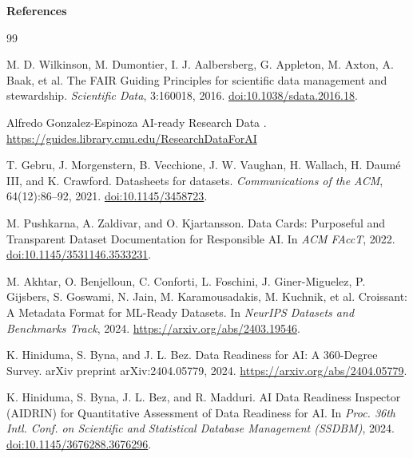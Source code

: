 \documentclass[10pt]{article}
\newcommand{\currentproposalpart}{Main Workshop Proposal}
\newcommand{\setproposalpart}[1]{\gdef\currentproposalpart{#1}}
\newcommand{\proposalbanner}[2]{%
  \noindent\colorbox{black!8}{\parbox{\dimexpr\linewidth-2\fboxsep\relax}{\textbf{#1}\hfill\textit{#2}}}%
  \vspace{2pt}%
}
\begin{document}
\clearpage
\setproposalpart{References}
\proposalbanner{References}{}
\renewcommand{\refname}{References}
\begin{thebibliography}{99}

M. D. Wilkinson, M. Dumontier, I. J. Aalbersberg, G. Appleton, M. Axton, A. Baak, et al.
\newblock The FAIR Guiding Principles for scientific data management and stewardship.
\newblock \emph{Scientific Data}, 3:160018, 2016. \href{https://doi.org/10.1038/sdata.2016.18}{doi:10.1038/sdata.2016.18}.

Alfredo Gonzalez-Espinoza
\newblock AI-ready Research Data
. \href{https://guides.library.cmu.edu/ResearchDataForAI}{https://guides.library.cmu.edu/ResearchDataForAI}

T. Gebru, J. Morgenstern, B. Vecchione, J. W. Vaughan, H. Wallach, H. Daum\'{e} III, and K. Crawford.
\newblock Datasheets for datasets.
\newblock \emph{Communications of the ACM}, 64(12):86--92, 2021. \href{https://doi.org/10.1145/3458723}{doi:10.1145/3458723}.

M. Pushkarna, A. Zaldivar, and O. Kjartansson.
\newblock Data Cards: Purposeful and Transparent Dataset Documentation for Responsible AI.
\newblock In \emph{ACM FAccT}, 2022. \href{https://doi.org/10.1145/3531146.3533231}{doi:10.1145/3531146.3533231}.

M. Akhtar, O. Benjelloun, C. Conforti, L. Foschini, J. Giner-Miguelez, P. Gijsbers, S. Goswami, N. Jain, M. Karamousadakis, M. Kuchnik, et al.
\newblock Croissant: A Metadata Format for ML-Ready Datasets.
\newblock In \emph{NeurIPS Datasets and Benchmarks Track}, 2024.
\newblock \url{https://arxiv.org/abs/2403.19546}.

K. Hiniduma, S. Byna, and J. L. Bez.
\newblock Data Readiness for AI: A 360-Degree Survey.
\newblock arXiv preprint arXiv:2404.05779, 2024.
\newblock \url{https://arxiv.org/abs/2404.05779}.

K. Hiniduma, S. Byna, J. L. Bez, and R. Madduri.
\newblock AI Data Readiness Inspector (AIDRIN) for Quantitative Assessment of Data Readiness for AI.
\newblock In \emph{Proc. 36th Intl. Conf. on Scientific and Statistical Database Management (SSDBM)}, 2024. \href{https://doi.org/10.1145/3676288.3676296}{doi:10.1145/3676288.3676296}.


\end{thebibliography}
\end{document}
